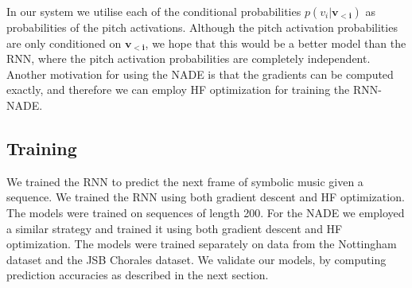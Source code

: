 	In our system we utilise each of the conditional probabilities $p(v_i|\mathbf{v_{<i}})$ as probabilities of the pitch activations. Although the pitch activation probabilities are only conditioned on $\mathbf{v_{<i}}$, we hope that this would be a better model than the RNN, where the pitch activation probabilities are completely independent. Another motivation for using the NADE is that the gradients can be computed exactly, and therefore we can employ HF optimization for training the RNN-NADE. 


	
	
	\subsection{Training}
	\label{subsec:training}
	We trained the RNN to predict the next frame of symbolic music given a sequence. We trained the RNN using both gradient descent and HF optimization. The models were trained on sequences of length 200. For the NADE we employed a similar strategy and trained it using both gradient descent and HF optimization. The models were trained separately on data from the Nottingham dataset and the JSB Chorales dataset. We validate our models, by computing prediction accuracies as described in the next section. 
	


